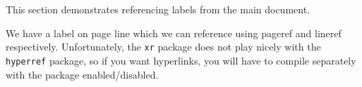 \reviewersection
\begin{point}
This section demonstrates referencing labels from the main document.
\end{point}

\begin{reply}
    We have a label on page \pageref{point:1} line  which we can reference using pageref and lineref respectively.
    Unfortunately, the \verb|xr| package does not play nicely with the \verb|hyperref| package, so if you want hyperlinks, you will have to compile separately with the package enabled/disabled.
\end{reply}